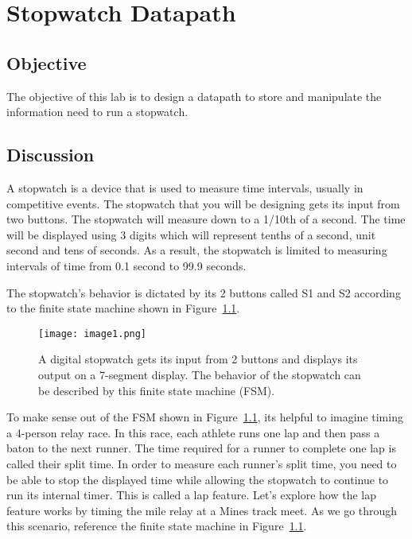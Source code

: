 \chapter{Stopwatch Datapath}
\label{chapter:stopDatapath}
\graphicspath{ {./Lab09Datapath/Fig} }



\hypertarget{objective}{%
\section{Objective}\label{section:swObjective}}

The objective of this lab is to design a datapath to store and
manipulate the information need to run a stopwatch.

\section{Discussion}

A stopwatch is a device that is used to measure time intervals, usually
in competitive events. The stopwatch that you will be designing gets its
input from two buttons. The stopwatch will measure down to a 1/10th of a
second. The time will be displayed using 3 digits which will represent
tenths of a second, unit second and tens of seconds. As a result, the
stopwatch is limited to measuring intervals of time from 0.1 second to
99.9 seconds.

The stopwatch's behavior is dictated by its 2 buttons called S1 and S2
according to the finite state machine shown in Figure~\ref{fig:swDPbehavior}.

\begin{figure}[ht]
\texttt{[image: image1.png]}
\caption{A digital stopwatch gets its input from 2 buttons and displays
its output on a 7-segment display. The behavior of the stopwatch can be
described by this finite state machine (FSM).}
\label{fig:swDPbehavior}
\end{figure}

To make sense out of the FSM shown in Figure~\ref{fig:swDPbehavior}, its helpful to imagine
timing a 4-person relay race. In this race, each athlete runs one lap
and then pass a baton to the next runner. The time required for a runner
to complete one lap is called their split time. In order to measure each
runner's split time, you need to be able to stop the displayed time
while allowing the stopwatch to continue to run its internal timer. This
is called a lap feature. Let's explore how the lap feature works by
timing the mile relay at a Mines track meet. As we go through this
scenario, reference the finite state machine in Figure~\ref{fig:swDPbehavior}.

